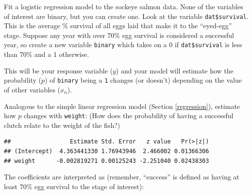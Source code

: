 \documentclass[]{book}
\newenvironment{Shaded}{\begin{snugshade}}{\end{snugshade}}
\newcommand{\DataTypeTok}[1]{\textcolor[rgb]{0.13,0.29,0.53}{#1}}
\newcommand{\DecValTok}[1]{\textcolor[rgb]{0.00,0.00,0.81}{#1}}
\newcommand{\KeywordTok}[1]{\textcolor[rgb]{0.13,0.29,0.53}{\textbf{#1}}}
\newcommand{\NormalTok}[1]{#1}
\newcommand{\OperatorTok}[1]{\textcolor[rgb]{0.81,0.36,0.00}{\textbf{#1}}}
\newcommand{\StringTok}[1]{\textcolor[rgb]{0.31,0.60,0.02}{#1}}
\begin{document}
Fit a logistic regression model to the sockeye salmon data. None of the variables of interest are binary, but you can create one. Look at the variable \texttt{dat\$survival}. This is the average \% survival of all eggs laid that make it to the ``eyed-egg'' stage. Suppose any year with over 70\% egg survival is considered a successful year, so create a new variable \texttt{binary} which takes on a 0 if \texttt{dat\$survival} is less than 70\% and a 1 otherwise.

\begin{Shaded}
\end{Shaded}

This will be your response variable (\(y\)) and your model will estimate how the probability (\(p\)) of \texttt{binary} being a \texttt{1} changes (or doesn't) depending on the value of other variables (\(x_{n}\)).

Analogous to the simple linear regression model (Section \ref{regression}), estimate how \(p\) changes with \texttt{weight}: (How does the probability of having a successful clutch relate to the weight of the fish?)

\begin{Shaded}
\end{Shaded}

\begin{verbatim}
##                 Estimate Std. Error   z value   Pr(>|z|)
## (Intercept)  4.363441330 1.76943946  2.466002 0.01366306
## weight      -0.002819271 0.00125243 -2.251040 0.02438303
\end{verbatim}

The coefficients are interpreted as (remember, ``success'' is defined as having at least 70\% egg survival to the stage of interest):
\end{document}
